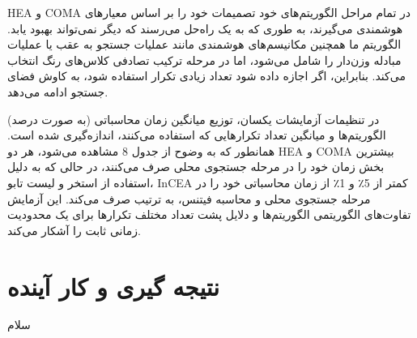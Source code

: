 \documentclass[a4paper,10pt]{article}
\begin{document}
            HEA و COMA در تمام مراحل الگوریتم‌های خود تصمیمات خود را بر اساس معیارهای هوشمندی می‌گیرند، به طوری که به یک راه‌حل می‌رسند که دیگر نمی‌تواند بهبود یابد. الگوریتم ما همچنین مکانیسم‌های هوشمندی مانند عملیات جستجو به عقب یا عملیات مبادله وزن‌دار را شامل می‌شود، اما در مرحله ترکیب تصادفی کلاس‌های رنگ انتخاب می‌کند. بنابراین، اگر اجازه داده شود تعداد زیادی تکرار استفاده شود، به کاوش فضای جستجو ادامه می‌دهد.

            در تنظیمات آزمایشات یکسان، توزیع میانگین زمان محاسباتی (به صورت درصد) الگوریتم‌ها و میانگین تعداد تکرارهایی که استفاده می‌کنند، اندازه‌گیری شده است. همانطور که به وضوح از جدول 8 مشاهده می‌شود، هر دو HEA و COMA بیشترین بخش زمان خود را در مرحله جستجوی محلی صرف می‌کنند، در حالی که به دلیل استفاده از استخر و لیست تابو، InCEA کمتر از 5٪ و 1٪ از زمان محاسباتی خود را در مرحله جستجوی محلی و محاسبه فیتنس، به ترتیب صرف می‌کند. این آزمایش تفاوت‌های الگوریتمی الگوریتم‌ها و دلایل پشت تعداد مختلف تکرارها برای یک محدودیت زمانی ثابت را آشکار می‌کند.

    \section{نتیجه گیری و کار آینده}

        سلام
\end{document}
